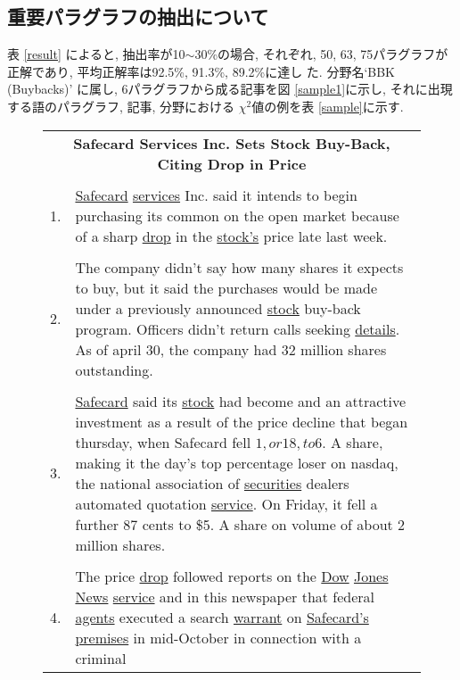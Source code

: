 \subsection{重要パラグラフの抽出について}


表 \ref{result} によると, 抽出率が10$\sim$30\%の場合, それぞれ, 50,
63, 75パラグラフが正解であり, 平均正解率は92.5\%, 91.3\%, 89.2\%に達し
た.  分野名`BBK (Buybacks)' に属し, 6パラグラフから成る記事を図
\ref{sample1}に示し, それに出現する語のパラグラフ, 記事, 分野における
$\chi^2$値の例を表 \ref{sample}に示す.

{\footnotesize
\begin{figure}[htbp]
\begin{center}
\begin{tabular}{|ll|} \hline 
\multicolumn{2}{|c|}{{\bf Safecard Services Inc. Sets Stock Buy-Back, Citing Drop in Price}} \\ 
\multicolumn{2}{|c|}{} \\
1. &\parbox[t]{12cm}{\underline{Safecard} \underline{services} Inc. said it intends to begin purchasing its common
on the open market because of a sharp \underline{drop} in the \underline{stock's} price late
last week.} \\ 
 \\
2. &\parbox[t]{12cm}{The company didn't say how many shares it expects to buy, but it
said the purchases would be made under a previously announced \underline{stock}
buy-back program. Officers didn't return calls seeking \underline{details}. As of
april 30, the company had 32 million shares outstanding.} \\ 
 \\
3. &\parbox[t]{12cm}{\underline{Safecard} said its \underline{stock} had become and an attractive investment as
a result of the price decline that began thursday, when Safecard fell
$1, or 18, to $6. A share, making it the day's top percentage loser
on nasdaq, the national association of \underline{securities} dealers automated
quotation \underline{service}. On Friday, it fell a further 87 cents to \$5. A
share on volume of about 2 million shares.} \\ 
 \\
4. &\parbox[t]{12cm}{The price \underline{drop} followed reports on the \underline{Dow} \underline{Jones} \underline{News} \underline{service} and
in this newspaper that federal \underline{agents} executed a search \underline{warrant} on
\underline{Safecard's} \underline{premises} in mid-October in connection with a criminal
}
\end{tabular}
\end{center}
\end{figure}}
